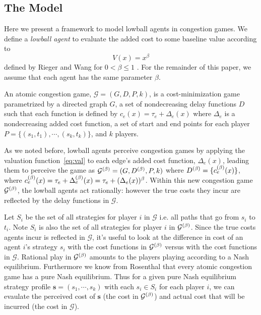 \documentclass[twoside]{article}
\begin{document}
\begin{multicols}{2}
\section{The Model}

Here we present a framework to model lowball agents in congestion games. We define a 
\textit{lowball agent} to evaluate the added cost to some baseline value according to
\begin{equation}
  V(x) = x^{\beta}
  \label{eq:val}
\end{equation}
defined by Rieger and Wang for $0 < \beta \le 1$ \cite{Rieger2008}. For the
remainder of this paper, we assume that each agent has the same parameter
$\beta$.

An atomic congestion game, $\mathcal{G} = (G, D, P, k)$, is a cost-minimization
game parametrized by a directed graph $G$, a set of nondecreasing delay
functions $D$ such that each function is defined by $c_e(x) = \tau_e + \Delta_e(x)$ where $\Delta_e$ is a nondecreasing added cost function, a set of start and end
points for each player $P =\{(s_1, t_1), \cdots, (s_k, t_k)\}$, and $k$ players.

As we noted before, lowball agents perceive congestion games by applying the valuation
function~\eqref{eq:val} to each edge's added cost function, $\Delta_e(x)$, leading them to
perceive the game as $\mathcal{G}^{(\beta)}= (G, D^{(\beta)}, P, k)$ where $D^{(\beta)} =
\{c_e^{(\beta)}(x)\}$, where $c_e^{(\beta)}(x) = \tau_e + \Delta_e^{(\beta)}(x) = \tau_e + (\Delta_e(x))^\beta$. Within this new
congestion game $\mathcal{G}^{(\beta)}$, the lowball agents act rationally: however
the true costs they incur are reflected by the delay functions in $\mathcal{G}$.   

Let $S_i$ be the set of all strategies for player $i$ in $\mathcal{G}$ i.e. all
paths that go from $s_i$ to $t_i$.  Note $S_i$ is also the set of all strategies for
player $i$ in $\mathcal{G}^{(\beta)}$.  Since the true costs agents incur is
reflected in $\mathcal{G}$, it's useful to look at the difference in cost of an
agent $i$'s strategy $s_i$ with the
cost functions in $\mathcal{G}^{(\beta)}$ versus with the cost functions in $\mathcal{G}$.
Rational play in $\mathcal{G}^{(\beta)}$ amounts to the players playing according to
a Nash equilibrium.  Furthermore we know from Rosenthal \cite{Rosenthal1973}
that every atomic congestion game has a pure Nash equilibrium.  Thus for a given
pure Nash equilibrium strategy profile $\mathbf{s} = (s_1, \cdots, s_k)$ with
each $s_i \in S_i$ for each player $i$, we can evaulate the perceived cost of
$\mathbf{s}$ (the cost in $\mathcal{G}^{(\beta)}$) and actual cost that will be
incurred (the cost in $\mathcal{G}$).


\end{multicols}
\end{document}
